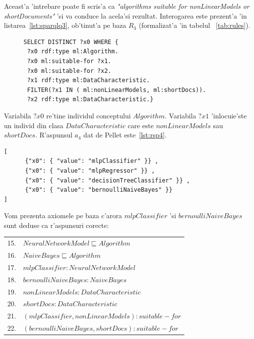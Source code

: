\documentclass[12pt,a4paper,twoside]{report}
\begin{document}
Aceast'a 'intrebare poate fi scris'a ca {\it"algorithms suitable for nonLinearModels or shortDocuments"} 'si va conduce la acela'si rezultat. Interogarea este prezent'a 'in listarea~\ref{lst:sparqlq3}, ob'tinut'a pe baza $R_3$ (formalizat'a 'in tabelul ~\ref{tab:rules}).

\begin{figure}[h]
\begin{footnotesize}
\begin{lstlisting}[captionpos=b, caption=Formalizarea SPARQL a interog'arii $Q_3$, label=lst:sparqlq3,  basicstyle=\ttfamily,frame=single]
SELECT DISTINCT ?x0 WHERE {
 ?x0 rdf:type ml:Algorithm.
 ?x0 ml:suitable-for ?x1.
 ?x0 ml:suitable-for ?x2.
 ?x1 rdf:type ml:DataCharacteristic.
 FILTER(?x1 IN ( ml:nonLinearModels, ml:shortDocs)).
 ?x2 rdf:type ml:DataCharacteristic.}
\end{lstlisting}
\end{footnotesize}
\end{figure}


Variabila $?x0$ re'tine individul conceptului $Algorithm$. Variabila $?x1$ 'inlocuie'ste un individ din clasa $DataCharacteristic$ care este $nonLinearModels$ sau $shortDocs$. R'aspunsul $a_4$ dat de Pellet este~\ref{lst:rsp4}.

\begin{lstlisting}[basicstyle=\footnotesize, caption = R'aspunsul $a_4$ la 'intrebarea $Q_3$, label=lst:rsp4]
[
      {"x0": { "value": "mlpClassifier" }} ,
      {"x0": { "value": "mlpRegressor" }} ,
      {"x0": { "value": "decisionTreeClassifier" }} ,
      {"x0": { "value": "bernoulliNaiveBayes" }}
]
\end{lstlisting}

Vom prezenta axiomele pe baza c'arora $mlpClassifier$ 'si $bernoulliNaiveBayes$ sunt deduse ca r'aspunsuri corecte:

\vspace*{0.3cm}
\begin{small}
\begin{tabular}{ll}
15. & $NeuralNetworkModel  \sqsubseteq Algorithm$\\
16. & $NaiveBayes  \sqsubseteq Algorithm$\\
17. & $mlpClassifier:NeuralNetworkModel$\\
18. & $bernoulliNaiveBayes: NaiveBayes$\\
19. & $nonLinearModels: DataCharacteristic$\\
20. & $shortDocs: DataCharacteristic$\\
21. & $(mlpClassifier, nonLinearModels):suitable-for$\\
22. & $(bernoulliNaiveBayes, shortDocs):suitable-for$\\
\end{tabular}
\end{small}
\vspace*{0.3cm}
\end{document}
